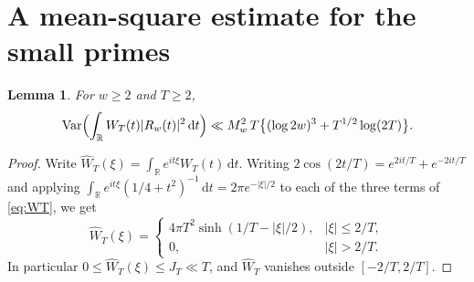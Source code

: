 \documentclass[11pt]{amsart}
\newtheorem{lemma}[theorem]{Lemma}
\theoremstyle{remark}
\numberwithin{equation}{section}
\newcommand{\R}{\mathbb{R}}
\newcommand{\Var}{\operatorname{Var}}
\newcommand{\dd}{\,\mathrm{d}}
\begin{document}
\section{A mean-square estimate for the small primes}\label{sec:small}

\begin{lemma}\label{lem:var}
For $w\ge2$ and $T\ge2$,
\begin{equation}\label{eq:var}
\Var\Bigl(\int_\R W_T(t)|R_w(t)|^2\dd t\Bigr)\ll M_w^2\,T\bigl\{(\log 2w)^3+T^{1/2}\log(2T)\bigr\}.
\end{equation}
\end{lemma}

\begin{proof}
Write $\widehat W_T(\xi)=\int_\R e^{it\xi}W_T(t)\dd t$. Writing $2\cos(2t/T)=e^{2it/T}+e^{-2it/T}$ and applying $\int_\R e^{it\xi}(1/4+t^2)^{-1}\dd t=2\pi e^{-|\xi|/2}$ to each of the three terms of \eqref{eq:WT}, we get
\begin{equation}\label{eq:What}
\widehat W_T(\xi)=\begin{cases}4\pi T^2\sinh(1/T-|\xi|/2),&|\xi|\le2/T,\\0,&|\xi|>2/T.\end{cases}
\end{equation}
In particular $0\le\widehat W_T(\xi)\le J_T\ll T$, and $\widehat W_T$ vanishes outside $[-2/T,2/T]$.


\end{proof}
\end{document}
